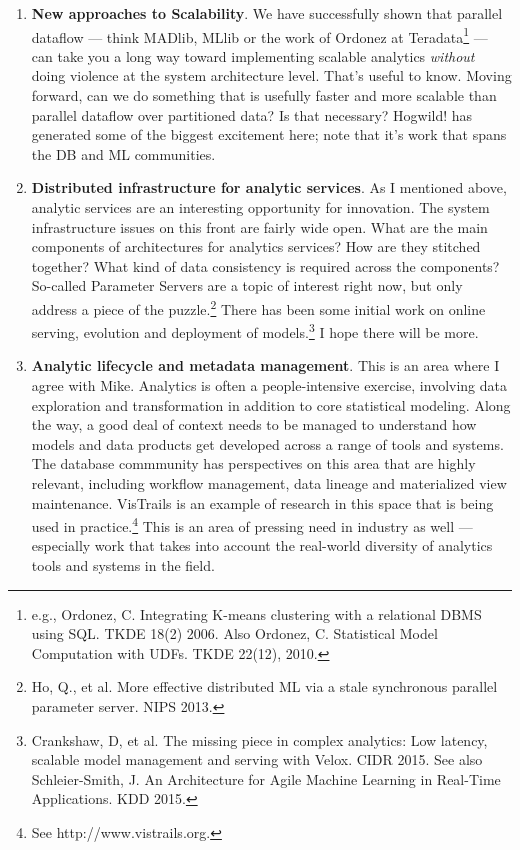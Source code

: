 \documentclass[b5paper,11pt,twoside,openright]{book}
\begin{document}
\begin{enumerate}
  \item
  {\textbf{New approaches to Scalability}}. We have successfully shown
  that parallel dataflow --- think MADlib, MLlib or the work of Ordonez
  at Teradata\footnote{e.g., Ordonez, C. Integrating K-means clustering with a relational
    DBMS using SQL. TKDE 18(2) 2006. Also Ordonez, C. Statistical Model
    Computation with UDFs. TKDE 22(12), 2010.} --- can take
  you a long way toward implementing scalable analytics \emph{without}
  doing violence at the system architecture level. That's useful to
  know. Moving forward, can we do something that is usefully faster and
  more scalable than parallel dataflow over partitioned data? Is that
  necessary? Hogwild! has generated some of the biggest excitement here;
  note that it's work that spans the DB and ML communities.
  \item
  {\textbf{Distributed infrastructure for analytic services}}. As I
  mentioned above, analytic services are an interesting opportunity for
  innovation. The system infrastructure issues on this front are fairly
  wide open. What are the main components of architectures for analytics
  services? How are they stitched together? What kind of data
  consistency is required across the components? So-called Parameter
  Servers are a topic of interest right now, but only address a piece of
  the puzzle.\footnote{Ho, Q., et al. More effective distributed ML via a stale synchronous
    parallel parameter server. NIPS 2013.} There has been
  some initial work on online serving, evolution and deployment of
  models.\footnote{Crankshaw, D, et al. The missing piece in complex analytics: Low
    latency, scalable model management and serving with Velox. CIDR 2015.
    See also Schleier-Smith, J. An Architecture for Agile Machine Learning
    in Real-Time Applications. KDD 2015.} I hope there will
  be more.
  \item
  {\textbf{Analytic lifecycle and metadata management}}. This is an area
  where I agree with Mike. Analytics is often a people-intensive
  exercise, involving data exploration and transformation in addition to
  core statistical modeling. Along the way, a good deal of context needs
  to be managed to understand how models and data products get developed
  across a range of tools and systems. The database commmunity has
  perspectives on this area that are highly relevant, including workflow
  management, data lineage and materialized view maintenance. VisTrails
  is an example of research in this space that is being used in
  practice.\footnote{See http://www.vistrails.org.} This is an area
  of pressing need in industry as well --- especially work that takes
  into account the real-world diversity of analytics tools and systems
  in the field.
\end{enumerate}
\end{document}

